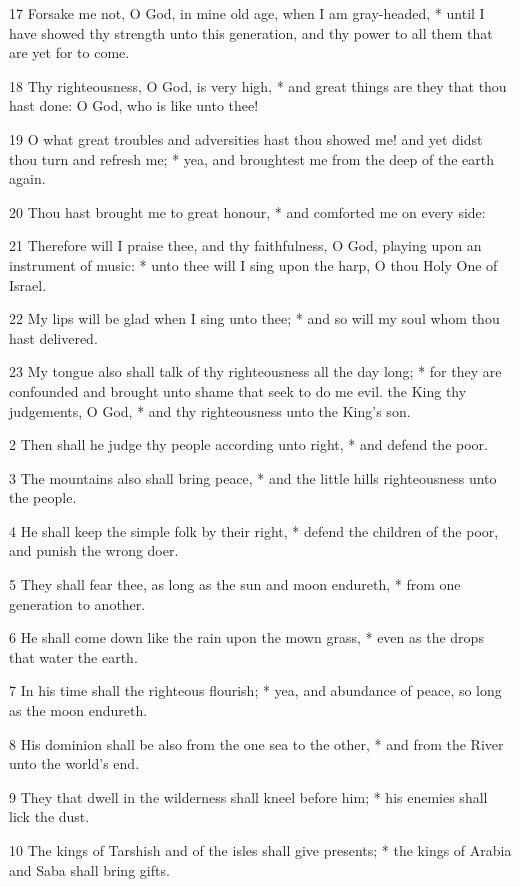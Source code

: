 17 Forsake me not, O God, in mine old age, when I am gray-headed, * until I have showed thy strength unto this generation, and thy power to all them that are yet for to come.\par
18 Thy righteousness, O God, is very high, * and great things are they that thou hast done: O God, who is like unto thee!\par
19 O what great troubles and adversities hast thou showed me! and yet didst thou turn and refresh me; * yea, and broughtest me from the deep of the earth again.\par
20 Thou hast brought me to great honour, * and comforted me on every side:\par
21 Therefore will I praise thee, and thy faithfulness, O God, playing upon an instrument of music: * unto thee will I sing upon the harp, O thou Holy One of Israel.\par
22 My lips will be glad when I sing unto thee; * and so will my soul whom thou hast delivered.\par
23 My tongue also shall talk of thy righteousness all the day long; * for they are confounded and brought unto shame that seek to do me evil.
 the King thy judgements, O God, * and thy righteousness unto the King's son.\par
2 Then shall he judge thy people according unto right, * and defend the poor.\par
3 The mountains also shall bring peace, * and the little hills righteousness unto the people.\par
4 He shall keep the simple folk by their right, * defend the children of the poor, and punish the wrong doer.\par
5 They shall fear thee, as long as the sun and moon endureth, * from one generation to another.\par
6 He shall come down like the rain upon the mown grass, * even as the drops that water the earth.\par
7 In his time shall the righteous flourish; * yea, and abundance of peace, so long as the moon endureth.\par
8 His dominion shall be also from the one sea to the other, * and from the River unto the world's end.\par
9 They that dwell in the wilderness shall kneel before him; * his enemies shall lick the dust.\par
10 The kings of Tarshish and of the isles shall give presents; * the kings of Arabia and Saba shall bring gifts.\par
